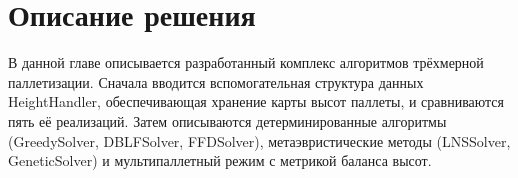 \chapter{Описание решения}

В данной главе описывается разработанный комплекс алгоритмов трёхмерной паллетизации. Сначала вводится вспомогательная структура данных HeightHandler, обеспечивающая хранение карты высот паллеты, и сравниваются пять её реализаций. Затем описываются детерминированные алгоритмы (GreedySolver, DBLFSolver, FFDSolver), метаэвристические методы (LNSSolver, GeneticSolver) и мультипаллетный режим с метрикой баланса высот.

